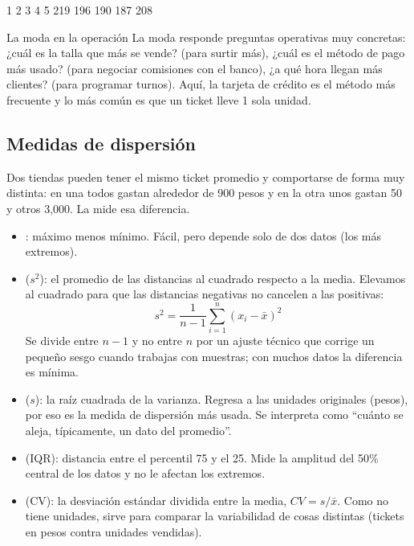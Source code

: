 \begin{rsalida}
  1   2   3   4   5
219 196 190 187 208
\end{rsalida}

\begin{negocio}{La moda en la operación}
La moda responde preguntas operativas muy concretas: ¿cuál es la talla que más
se vende? (para surtir más), ¿cuál es el método de pago más usado? (para
negociar comisiones con el banco), ¿a qué hora llegan más clientes? (para
programar turnos). Aquí, la tarjeta de crédito es el método más frecuente y
lo más común es que un ticket lleve 1 sola unidad.
\end{negocio}

\subsection{Medidas de dispersión}

Dos tiendas pueden tener el mismo ticket promedio y comportarse de forma muy
distinta: en una todos gastan alrededor de 900 pesos y en la otra unos gastan
50 y otros 3,000. La  mide esa diferencia.

\begin{itemize}
  \item {}: máximo menos mínimo. Fácil, pero depende solo de dos
        datos (los más extremos).
  \item {} ($s^2$): el promedio de las distancias al
        cuadrado respecto a la media. Elevamos al cuadrado para que las
        distancias negativas no cancelen a las positivas:
        \[ s^2 = \frac{1}{n-1}\sum_{i=1}^{n}(x_i - \bar{x})^2 \]
        Se divide entre $n-1$ y no entre $n$ por un ajuste técnico que
        corrige un pequeño sesgo cuando trabajas con muestras; con muchos
        datos la diferencia es mínima.
  \item {} ($s$): la raíz cuadrada de la
        varianza. Regresa a las unidades originales (pesos), por eso es la
        medida de dispersión más usada. Se interpreta como ``cuánto se aleja,
        típicamente, un dato del promedio''.
  \item {} (IQR): distancia entre el percentil
        75 y el 25. Mide la amplitud del 50\% central de los datos y no le
        afectan los extremos.
  \item {} (CV): la desviación estándar
        dividida entre la media, $CV = s/\bar{x}$. Como no tiene unidades,
        sirve para comparar la variabilidad de cosas distintas (tickets en
        pesos contra unidades vendidas).
\end{itemize}

